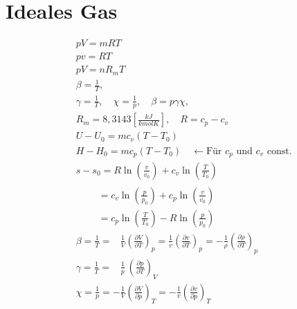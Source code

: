 \documentclass[twocolumn]{article}
\begin{document}
\section{Ideales Gas}
\begin{align*}
	&pV = mRT \\
	&pv = RT \\
	&pV = nR_mT \\
	&\beta = \frac{1}{T},\quad  \\
	&\gamma = \frac{1}{T},\quad 
	\chi = \frac{1}{p}, \quad \beta = p \gamma \chi, \quad  \\
	&R_m = 8,3143\left[\frac{kJ}{kmolK}\right], \quad 
	R = c_p - c_v \quad  \\
	&U - U_0 = mc_v(T-T_0) \\
	&H - H_0 = mc_p(T-T_0) \quad \leftarrow \text{Für $c_p$ und $c_v$ const.} \\
	&s - s_0 = R \ln \left(\frac{ v}{ v_0}\right)_{} + c_v \ln \left(\frac{ T}{ T_0}\right)_{} \\
	&\qquad \; = c_v \ln \left( \frac{p}{p_0} \right) + c_p \ln \left( \frac{v}{v_0} \right) \\
	&\qquad \; = c_p \ln \left( \frac{T}{T_0} \right) -R \ln \left( \frac{p}{p_0} \right) \\
	&\beta = \frac{1}{T} = \; \;\: \frac{1}{V}\left(\frac{\partial V}{\partial T}\right)_{p} =  \frac{1}{v}\left(\frac{\partial v}{\partial T}\right)_{p} =  - \frac{1}{\rho}\left(\frac{\partial \rho}{\partial T}\right)_{p}  \\
	&\gamma = \frac{1}{T} =  \; \;\; \frac{1}{p} \: \left(\frac{\partial p}{\partial T}\right)_{V} \\
	&\chi = \frac{1}{p} = - \frac{1}{V}\left(\frac{\partial V}{\partial p}\right)_{T}  = - \frac{1}{v}\left(\frac{\partial v}{\partial p}\right)_{T} \\
\end{align*}
\end{document}
